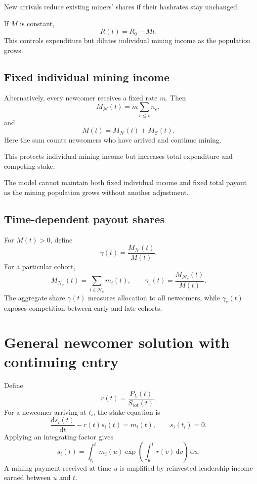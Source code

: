 \documentclass[11pt,a4paper]{article}
\newcommand{\rmd}{\mathrm{d}}
\begin{document}
New arrivals reduce existing miners' shares if their hashrates stay unchanged.

If $M$ is constant,
\begin{equation}
R(t)=R_0-Mt.
\end{equation}
This controls expenditure but dilutes individual mining income as the population grows.

\subsection{Fixed individual mining income}
Alternatively, every newcomer receives a fixed rate $m$. Then
\begin{equation}
M_{\mathcal N}(t)=m\sum_{e\le t}n_e,
\end{equation}
and
\begin{equation}
M(t)=M_{\mathcal N}(t)+M_{\mathcal C}(t).
\end{equation}
Here the sum counts newcomers who have arrived and continue mining.

This protects individual mining income but increases total expenditure and competing stake.

The model cannot maintain both fixed individual income and fixed total payout as the mining population grows without another adjustment.

\subsection{Time-dependent payout shares}
For $M(t)>0$, define
\begin{equation}
\gamma(t)=\frac{M_{\mathcal N}(t)}{M(t)}.
\end{equation}
For a particular cohort,
\begin{equation}
M_{\mathcal N_e}(t)=\sum_{i\in\mathcal N_e}m_i(t),\qquad\gamma_e(t)=\frac{M_{\mathcal N_e}(t)}{M(t)}.
\end{equation}
The aggregate share $\gamma(t)$ measures allocation to all newcomers, while $\gamma_e(t)$ exposes competition between early and late cohorts.

\section{General newcomer solution with continuing entry}
Define
\begin{equation}
r(t)=\frac{P_L(t)}{S_{\mathrm{tot}}(t)}.
\end{equation}
For a newcomer arriving at $t_i$, the stake equation is
\begin{equation}
\frac{\rmd s_i(t)}{\rmd t}-r(t)s_i(t)=m_i(t),\qquad s_i(t_i)=0.
\end{equation}
Applying an integrating factor gives
\begin{equation}
\boxed{s_i(t)=\int_{t_i}^{t}m_i(u)\exp\!\left(\int_u^t r(v)\,\rmd v\right)\,\rmd u.}
\end{equation}
A mining payment received at time $u$ is amplified by reinvested leadership income earned between $u$ and $t$.
\end{document}

